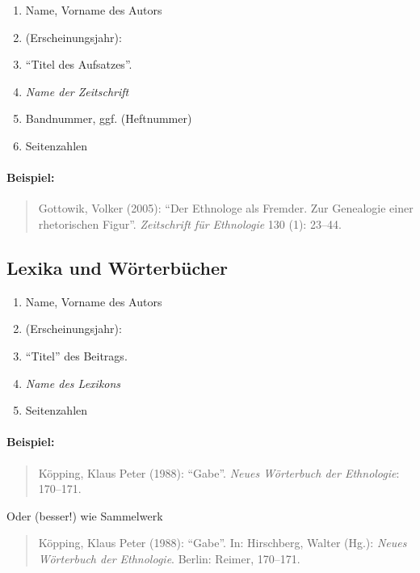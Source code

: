 \documentclass[ 12pt,
                titlepage,
                parskip=half,
                version=first,
                bibliography=totocnumbered,
                final,
                listof=totoc]{scrartcl}
\begin{document}
\begin{samepage}
\begin{enumerate}
    \item Name, Vorname des Autors
    \item (Erscheinungsjahr):
    \item \enquote{Titel des Aufsatzes}.
    \item \emph{Name der Zeitschrift}
    \item Bandnummer, ggf. (Heftnummer)
    \item Seitenzahlen
\end{enumerate}
\end{samepage}

\paragraph{Beispiel:}
\begin{quote}
Gottowik, Volker (2005): \enquote{Der Ethnologe als Fremder. Zur Genealogie
einer rhetorischen Figur}. \emph{Zeitschrift für Ethnologie} 130 (1): 23--44.
\end{quote}

\subsection{Lexika und Wörterbücher}
\label{sec:sub_lexika_and_wörterbuch}

\begin{enumerate}
    \item Name, Vorname des Autors
    \item (Erscheinungsjahr):
    \item \enquote{Titel} des Beitrags.
    \item \emph{Name des Lexikons}
    \item Seitenzahlen
\end{enumerate}

\paragraph{Beispiel:}
\begin{quote}
Köpping, Klaus Peter (1988): \enquote{Gabe}. \emph{Neues Wörterbuch der Ethnologie}:
170--171.
\end{quote}

Oder (besser!) wie Sammelwerk

\begin{quote}
Köpping, Klaus Peter (1988): \enquote{Gabe}. In: Hirschberg, Walter (Hg.): \emph{Neues
Wörterbuch der Ethnologie}. Berlin: Reimer, 170--171.
\end{quote}
\end{document}

